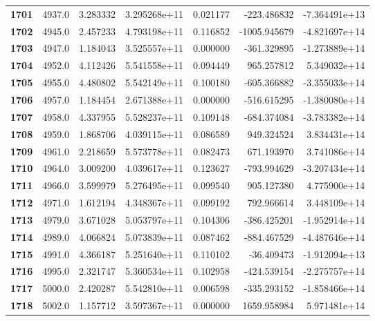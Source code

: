 \documentclass{report}[12pt]
\begin{document}
\begin{center}
\begin{tabular}{lrrrrrr}
\textbf{1701} &         4937.0 &   3.283332 &  3.295268e+11 &    0.021177 &  -223.486832 & -7.364491e+13 \\
\textbf{1702} &         4945.0 &   2.457233 &  4.793198e+11 &    0.116852 & -1005.945679 & -4.821697e+14 \\
\textbf{1703} &         4947.0 &   1.184043 &  3.525557e+11 &    0.000000 &  -361.329895 & -1.273889e+14 \\
\textbf{1704} &         4952.0 &   4.112426 &  5.541558e+11 &    0.094449 &   965.257812 &  5.349032e+14 \\
\textbf{1705} &         4955.0 &   4.480802 &  5.542149e+11 &    0.100180 &  -605.366882 & -3.355033e+14 \\
\textbf{1706} &         4957.0 &   1.184454 &  2.671388e+11 &    0.000000 &  -516.615295 & -1.380080e+14 \\
\textbf{1707} &         4958.0 &   4.337955 &  5.528237e+11 &    0.109148 &  -684.374084 & -3.783382e+14 \\
\textbf{1708} &         4959.0 &   1.868706 &  4.039115e+11 &    0.086589 &   949.324524 &  3.834431e+14 \\
\textbf{1709} &         4961.0 &   2.218659 &  5.573778e+11 &    0.082473 &   671.193970 &  3.741086e+14 \\
\textbf{1710} &         4964.0 &   3.009200 &  4.039617e+11 &    0.123627 &  -793.994629 & -3.207434e+14 \\
\textbf{1711} &         4966.0 &   3.599979 &  5.276495e+11 &    0.099540 &   905.127380 &  4.775900e+14 \\
\textbf{1712} &         4971.0 &   1.612194 &  4.348367e+11 &    0.099192 &   792.966614 &  3.448109e+14 \\
\textbf{1713} &         4979.0 &   3.671028 &  5.053797e+11 &    0.104306 &  -386.425201 & -1.952914e+14 \\
\textbf{1714} &         4989.0 &   4.066824 &  5.073839e+11 &    0.087462 &  -884.467529 & -4.487646e+14 \\
\textbf{1715} &         4991.0 &   4.366187 &  5.251640e+11 &    0.110102 &   -36.409473 & -1.912094e+13 \\
\textbf{1716} &         4995.0 &   2.321747 &  5.360534e+11 &    0.102958 &  -424.539154 & -2.275757e+14 \\
\textbf{1717} &         5000.0 &   2.420287 &  5.542810e+11 &    0.006598 &  -335.293152 & -1.858466e+14 \\
\textbf{1718} &         5002.0 &   1.157712 &  3.597367e+11 &    0.000000 &  1659.958984 &  5.971481e+14 \\

\end{tabular}
\end{center}
\end{document}
